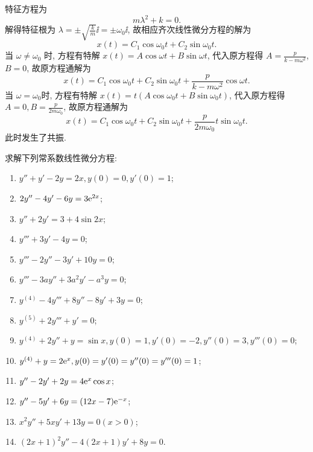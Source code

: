 \begin{solve}
  特征方程为
  \[m\lambda^2+k=0.\]
  解得特征根为 $\lambda=\pm\sqrt{\frac{k}{m}}\ii=\pm\omega_0\ii$, 故相应齐次线性微分方程的解为
  \[x(t)=C_1\cos\omega_0t+C_2\sin\omega_0t.\]
  当 $\omega\neq\omega_0$ 时, 方程有特解 $x(t)=A\cos\omega t+B\sin\omega t$, 
  代入原方程得 $A=\frac{p}{k-m\omega^2}$, $B=0$, 故原方程通解为
  \[x(t)=C_1\cos\omega_0t+C_2\sin\omega_0t+\frac{p}{k-m\omega^2}\cos\omega t.\]
  当 $\omega=\omega_0$时, 方程有特解 $x(t)=t(A\cos\omega_0t+B\sin\omega_0t)$,
  代入原方程得 $A=0,B=\frac{p}{2m\omega_0}$, 故原方程通解为
  \[x(t)=C_1\cos\omega_0t+C_2\sin\omega_0t+\frac{p}{2m\omega_0}t\sin\omega_0 t.\]
  此时发生了共振.
\end{solve}



\begin{exercise}
  求解下列常系数线性微分方程:
  \begin{enumerate}[(1)]
  \item $y''+y'-2y=2x,y(0)=0,y'(0)=1$;
  \item $2y''-4y'-6y=3\mathrm{e}^{2x}$;
  \item $y''+2y'=3+4\sin 2x$;
  \item $y'''+3y'-4y=0$;
  \item $y'''-2y''-3y'+10y=0$;
  \item $y'''-3ay''+3a^2y'-a^3y=0$;
  \item $y^{(4)}-4y'''+8y''-8y'+3y=0$;
  \item $y^{(5)}+2y'''+y'=0$;
  \item $y^{(4)}+2y''+y=\sin x,y(0)=1,y'(0)=-2,y''(0)=3,y'''(0)=0$;
  \item $y^{(4)}+y=2\mathrm{e}^x,y(0)=y'(0)=y''(0)=y'''(0)=1$;
  \item $y''-2y'+2y=4\mathrm{e}^x\cos x$;
  \item $y''-5y'+6y=(12x-7)\mathrm{e}^{-x}$;
  \item $x^2y''+5xy'+13y=0(x>0)$;
  \item $(2x+1)^2y''-4(2x+1)y'+8y=0$.
  \end{enumerate}
\end{exercise}

